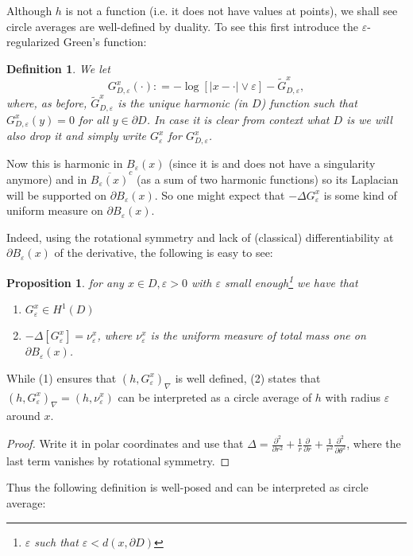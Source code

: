 \documentclass[11pt,reqno]{amsart}
\numberwithin{equation}{section}
\newtheorem{pro}[thm]{Proposition}
\newtheorem{defi}[thm]{Definition}
\newcommand{\deq}{\mathrel{\mathop:}=}
\newcommand{\eps}{\varepsilon}
\begin{document}
Although $h$ is not a function (i.e. it does not have values at points), we shall see circle averages are well-defined by duality. To see this first introduce the $\eps$-regularized Green's function:

\begin{defi}
	We let
	$$G_{D,\eps}^x(\cdot)\deq -\log[|x-\cdot|\vee \eps]-\tilde G_{D,\eps}^x,$$
	where, as before, $\tilde G_{D,\eps}^x$ is the unique harmonic (in $D$) function such that $G_{D,\eps}^x(y)=0$ for all $y\in \partial D$. In case it is clear from context what $D$ is we will also drop it and simply write $G_\eps^x$ for $G_{D,\eps}^x$.
\end{defi}

Now this is harmonic in $B_\eps(x)$ (since it is and does not have a singularity anymore) and in $\overline{B_\eps(x)}^c$ (as a sum of two harmonic functions) so its Laplacian will be supported on $\partial B_\eps(x)$. So one might expect that $-\Delta G_\eps^x$ is some kind of uniform measure on $\partial B_\eps(x)$. 

Indeed, using the rotational symmetry and lack of (classical) differentiability at $\partial B_\eps(x)$ of the derivative, the following is easy to see:

\begin{pro}\label{prop:circleAvg}
	for any $x\in D, \eps>0$ with $\eps$ small enough\footnote{$\eps$ such that $\eps<d(x,\partial D)$} we have that 
	\begin{enumerate}
		\item $G_\eps^x\in H^1(D)$
		\item $-\Delta[G_\eps^x] = \nu_\eps^x$, where $\nu_\eps^x$ is the uniform measure of total mass one on $\partial B_\eps(x)$.
	\end{enumerate}
\end{pro}

While (1) ensures that $(h,G_\eps^x)_\nabla$ is well defined, (2) states that $(h,G_\eps^x)_\nabla = (h,\nu_\eps^x)$ can be interpreted as a circle average of $h$ with radius $\eps$ around $x$.
\begin{proof}
	Write it in polar coordinates and use that $\Delta = \frac{\partial^2}{\partial r^2}+\frac{1}{r}\frac{\partial}{\partial r}+\frac{1}{r^2}\frac{\partial^2}{\partial\theta^2}$, where the last term vanishes by rotational symmetry.
\end{proof}

Thus the following definition is well-posed and can be interpreted as circle average:
\end{document}
